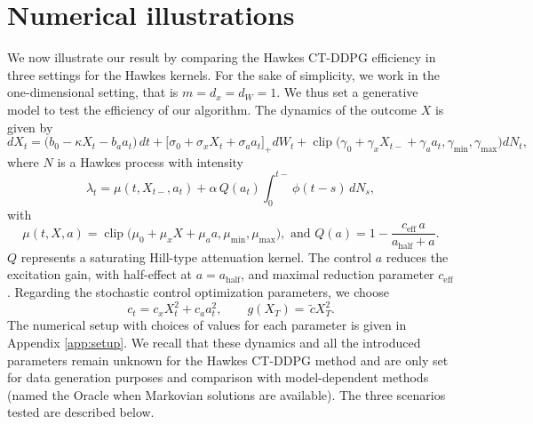 \documentclass[11pt]{article}
\theoremstyle{remarkitalic}
\theoremstyle{remarkitalic}
\newcommand{\1}{\mathbf 1}
\begin{document}
\section{Numerical illustrations}
\label{sec:numerics}
We now illustrate our result by comparing the Hawkes CT-DDPG efficiency in three settings for the Hawkes kernels. For the sake of simplicity, we work in the one-dimensional setting, that is $m=d_x=d_W=1$. We thus set a generative model to test the efficiency of our algorithm. The dynamics of the outcome $X$ is given by \[  dX_t = \bigl(b_0 - \kappa X_t - b_a a_t\bigr)\,dt
   + \bigl[\sigma_0 + \sigma_x X_t + \sigma_a a_t\bigr]_+ dW_t
   + \operatorname{clip}\!\bigl(\gamma_0 + \gamma_x X_{t-} + \gamma_a a_t,
   \gamma_{\min},\gamma_{\max}\bigr) dN_t,\]
where $N$ is a Hawkes process with intensity \[
 \lambda_t = \mu(t,X_{t-},a_t)
 + \alpha\,Q(a_t)\int_0^{t-}\phi(t-s)\,dN_s,\]
 with \[\mu(t,X,a) = \operatorname{clip}\!\bigl(\mu_0 + \mu_x X + \mu_a a,
 \mu_{\min},\mu_{\max}\bigr),
\text{ and }
 Q(a) = 1 - \frac{c_{\mathrm{eff}}\,a}{a_{\mathrm{half}} + a}.
\]
$Q$ represents a saturating Hill-type attenuation kernel. The control $a$ reduces the excitation gain, with half-effect at $a=a_{\mathrm{half}}$, and maximal reduction parameter $c_{\mathrm{eff}}$. Regarding the stochastic control optimization parameters, we choose \[
 c_t = c_x X_t^2 + c_a a_t^2,
 \qquad
 g(X_T) = \,\tilde c X_T^2 .
\] The numerical setup with choices of values for each parameter is given in Appendix \ref{app:setup}.
We recall that these dynamics and all the introduced parameters remain unknown for the Hawkes CT-DDPG method and are only set for data generation purposes and comparison with model-dependent methods (named the Oracle when Markovian solutions are available). The three scenarios tested are described below.
\end{document}
